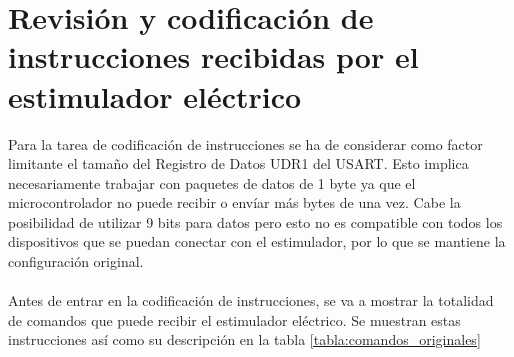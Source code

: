 \section{Revisión y codificación de instrucciones recibidas por el estimulador eléctrico}
Para la tarea de codificación de instrucciones se ha de considerar como factor limitante el tamaño del Registro de Datos UDR1 del USART. Esto implica necesariamente trabajar con paquetes de datos de 1 byte ya que el microcontrolador no puede recibir o envíar más bytes de una vez. Cabe la posibilidad de utilizar 9 bits para datos pero esto no es compatible con todos los dispositivos que se puedan conectar con el estimulador, por lo que se mantiene la configuración original.
\\
\\
Antes de entrar en la codificación de instrucciones, se va a mostrar la totalidad de comandos que puede recibir el estimulador eléctrico. Se muestran estas instrucciones así como su descripción en la tabla \ref{tabla:comandos_originales}

